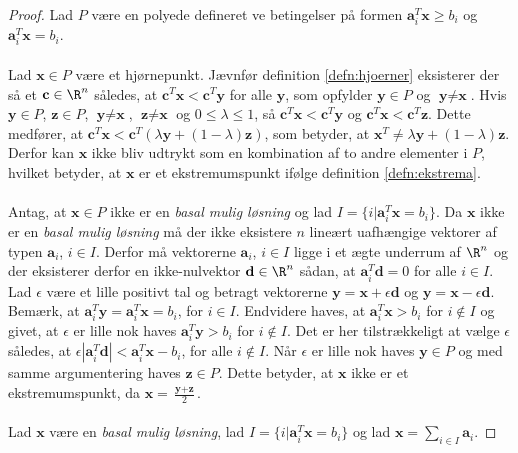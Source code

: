 %
\begin{proof}
Lad $P$ være en polyede defineret ve betingelser på formen $\textbf{a}_i^T\textbf{x} \geq b_i$ og $\textbf{a}_i^T\textbf{x} = b_i$.\\\\
%
Lad $\textbf{x} \in P$ være et hjørnepunkt. Jævnfør definition \ref{defn:hjoerner} eksisterer der så et $\textbf{c} \in \R^n$ således, at $\textbf{c}^T\textbf{x} < \textbf{c}^T\textbf{y}$ for alle $\textbf{y}$, som opfylder $\textbf{y} \in P$ og $\textbf{y} \neq \textbf{x}$.
Hvis $\textbf{y} \in P$, $\textbf{z} \in P$, $\textbf{y} \neq \textbf{x}$, $\textbf{z} \neq \textbf{x}$ og $0 \leq \lambda \leq 1$, så $\textbf{c}^T\textbf{x} < \textbf{c}^T\textbf{y}$ og $\textbf{c}^T\textbf{x} < \textbf{c}^T\textbf{z}$.
Dette medfører, at $\textbf{c}^T\textbf{x} < \textbf{c}^T(\lambda \textbf{y} + (1-\lambda)\textbf{z})$, som betyder, at $\textbf{x}^T \neq \lambda \textbf{y} + (1 - \lambda)\textbf{z}$.
Derfor kan $\textbf{x}$ ikke bliv udtrykt som en kombination af to andre elementer i $P$, hvilket betyder, at $\textbf{x}$ er et ekstremumspunkt ifølge definition \ref{defn:ekstrema}.\\\\
%
Antag, at $\textbf{x} \in P$ ikke er en \textit{basal mulig løsning} og lad $I = \{ i | \textbf{a}_i^T \textbf{x} = b_i\}$.
Da $\textbf{x}$ ikke er en \textit{basal mulig løsning} må der ikke eksistere $n$ lineært uafhængige vektorer af typen $\textbf{a}_i$, $i \in I$.
Derfor må vektorerne $\textbf{a}_i$, $i \in I$ ligge i et ægte underrum af $\R^n$ og der eksisterer derfor en ikke-nulvektor $\textbf{d} \in \R^n$ sådan, at $\textbf{a}_i^T\textbf{d} = 0$ for alle $i \in I$.
Lad $\epsilon$ være et lille positivt tal og betragt vektorerne $\textbf{y} = \textbf{x} + \epsilon\textbf{d}$ og $\textbf{y} = \textbf{x} - \epsilon\textbf{d}$.
Bemærk, at $\textbf{a}_i^T \textbf{y} = \textbf{a}_i^T \textbf{x} = b_i$, for $i \in I$.
Endvidere haves, at $\textbf{a}_i^T \textbf{x} > b_i$ for $i \notin I$ og givet, at $\epsilon$ er lille nok haves $\textbf{a}_i^T \textbf{y} > b_i$ for $i \notin I$.
Det er her tilstrækkeligt at vælge $\epsilon$ således, at $\epsilon |\textbf{a}_i^T\textbf{d}| < \textbf{a}_i^T\textbf{x} - b_i$, for alle $i \notin I$.
Når $\epsilon$ er lille nok haves $\textbf{y} \in P$ og med samme argumentering haves $\textbf{z} \in P$.
Dette betyder, at $\textbf{x}$ ikke er et ekstremumspunkt, da $\textbf{x} = \frac{\textbf{y} + \textbf{z}}{2}$.\\\\
%
Lad $\textbf{x}$ være en \textit{basal mulig løsning}, lad $I = \{i | \textbf{a}_i^T\textbf{x} = b_i \}$ og lad $\textbf{x}=\sum_{i \in I} \textbf{a}_i$.

\end{proof}
